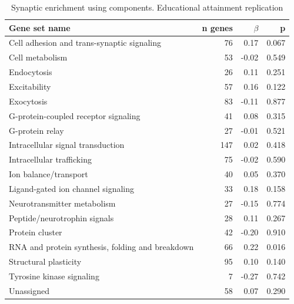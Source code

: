 \begin{table}[ht]
\centering
\begin{tabular}{lrrr}
  \toprule
Gene set name & n genes & $\beta$ & p\\
  \midrule
Cell adhesion and trans-synaptic signaling & 76 & 0.17 & 0.067 \\ 
  Cell metabolism & 53 & -0.02 & 0.549 \\ 
  Endocytosis & 26 & 0.11 & 0.251 \\ 
  Excitability & 57 & 0.16 & 0.122 \\ 
  Exocytosis & 83 & -0.11 & 0.877 \\ 
  G-protein-coupled receptor signaling & 41 & 0.08 & 0.315 \\ 
  G-protein relay & 27 & -0.01 & 0.521 \\ 
   Intracellular signal transduction & 147 & 0.02 & 0.418 \\ 
  Intracellular trafficking & 75 & -0.02 & 0.590 \\ 
  Ion balance/transport & 40 & 0.05 & 0.370 \\ 
  Ligand-gated ion channel signaling & 33 & 0.18 & 0.158 \\ 
  Neurotransmitter metabolism & 27 & -0.15 & 0.774 \\ 
  Peptide/neurotrophin signals & 28 & 0.11 & 0.267 \\ 
  Protein cluster & 42 & -0.20 & 0.910 \\ 
  RNA and protein synthesis, folding and breakdown & 66 & 0.22 & 0.016 \\ 
  Structural plasticity & 95 & 0.10 & 0.140 \\ 
  Tyrosine kinase signaling & 7 & -0.27 & 0.742 \\ 
  Unassigned & 58 & 0.07 & 0.290 \\ 
   \bottomrule
\end{tabular}
\caption{Synaptic enrichment using components. Educational attainment replication } 
\label{tab:MAGMA enrichment of synaptic groups EA2}
\end{table}
\clearpage

